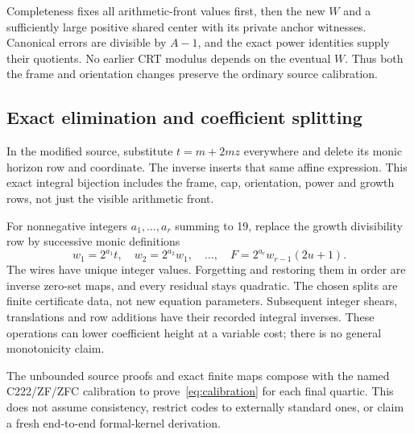 Completeness fixes all arithmetic-front values first, then the new $W$ and
a sufficiently large positive shared center with its private anchor witnesses.
Canonical errors are divisible by $A-1$, and the exact power identities
supply their quotients. No earlier CRT modulus depends on the eventual $W$.
Thus both the frame and orientation changes preserve the ordinary source
calibration.

\subsection{Exact elimination and coefficient splitting}
In the modified source, substitute $t=m+2mz$ everywhere and delete its
monic horizon row and coordinate. The inverse inserts that same affine
expression. This exact integral bijection includes the frame, cap,
orientation, power and growth rows, not just the visible arithmetic front.

For nonnegative integers $a_1,\ldots,a_r$ summing to 19, replace the growth
divisibility row by successive monic definitions
\[
 w_1=2^{a_1}t,\quad w_2=2^{a_2}w_1,\quad\ldots,\quad
 F=2^{a_r}w_{r-1}(2u+1).
\]
The wires have unique integer values. Forgetting and restoring them in order
are inverse zero-set maps, and every residual stays quadratic. The chosen
splits are finite certificate data, not new equation parameters. Subsequent
integer shears, translations and row additions have their recorded integral
inverses. These operations can lower coefficient height at a variable cost;
there is no general monotonicity claim.



The unbounded source proofs and exact finite maps compose with the named
C222/ZF/ZFC calibration to prove~\eqref{eq:calibration} for each final
quartic. This does not assume consistency, restrict codes to externally
standard ones, or claim a fresh end-to-end formal-kernel derivation.

